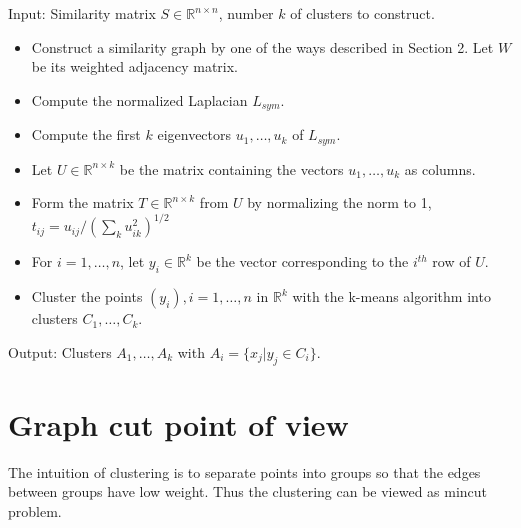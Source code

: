 \documentclass[10pt,a4paper, nocenter]{report}
\begin{document}
	Input: Similarity matrix $S \in \mathbb{R}^{n\times n}$, number $k$ of clusters to construct.
	\begin{itemize}
		\item Construct a similarity graph by one of the ways described in Section 2. Let $W$ be its weighted adjacency matrix.
		\item Compute the normalized Laplacian $L_{sym}$.
		\item Compute the first $k$ eigenvectors $u_{1},\dots, u_{k} $ of $L_{sym}$.
		\item Let $U \in \mathbb{R}^{n\times k}$ be the matrix containing the vectors $u_{1},\dots, u_{k}$ as columns.
		\item Form the matrix $T \in \mathbb{R}^{n\times k}$ from $U$ by normalizing the norm to 1, $t_{ij} = u_{ij}/(\sum_{k}u_{ik}^2)^{1/2}$
		\item For $i = 1,\dots, n$, let $y_{i} \in \mathbb{R}^k$ be the vector corresponding to the $i^{th}$ row of $U$.
		\item Cluster the points $(y_{i}), i=1,\dots,n$ in $\mathbb{R}^k$ with the k-means algorithm into clusters $C_{1},\dots, C_{k}$.
	\end{itemize} Output: Clusters $A_{1},\dots, A_{k}$ with $A_{i} = \{x_{j}| y_{j} \in C_{i}\}$.


	
	\chapter{Graph cut point of view}
	The intuition of clustering is to separate points into groups so that the edges between groups have low weight. Thus the clustering can be viewed as mincut problem.
	
\end{document}
